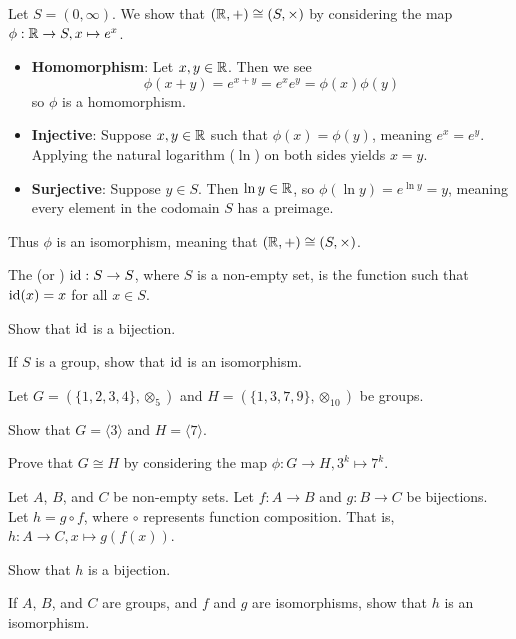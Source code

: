 \begin{example}
    Let $S = (0,\infty)$. We show that $(\mathbb{R}, +) \cong (S, \times)$ by considering the map $\phi: \mathbb{R} \to S, x \mapsto e^x$.
    \begin{itemize}
        \item \textbf{Homomorphism}: Let $x, y \in \mathbb{R}$. Then we see
        \[
            \phi(x+y) = e^{x+y} = e^xe^y = \phi(x)\phi(y)
        \]
        so $\phi$ is a homomorphism.

        \item \textbf{Injective}: Suppose $x, y \in \mathbb{R}$ such that $\phi(x) = \phi(y)$, meaning $e^x = e^y$. Applying the natural logarithm ($\ln$) on both sides yields $x = y$.

        \item \textbf{Surjective}: Suppose $y \in S$. Then $\ln y \in \mathbb{R}$, so $\phi(\ln y) = e^{\ln y} = y$, meaning every element in the codomain $S$ has a preimage.
    \end{itemize}

    Thus $\phi$ is an isomorphism, meaning that $(\mathbb{R}, +) \cong (S, \times)$.
\end{example}

\begin{exercise}\label{exercise-identity-map-is-isomorphism}
    The  (or ) $\mathrm{id}: S \to S$, where $S$ is a non-empty set, is the function such that $\mathrm{id}(x) = x$ for all $x \in S$.
    \begin{partquestions}{\roman*}
        \item Show that $\mathrm{id}$ is a bijection.
        \item If $S$ is a group, show that $\mathrm{id}$ is an isomorphism.
    \end{partquestions}
\end{exercise}
\begin{exercise}
    Let $G = (\{1, 2, 3, 4\}, \otimes_5)$ and $H = (\{1, 3, 7, 9\}, \otimes_{10})$ be groups.
    \begin{partquestions}{\roman*}
        \item Show that $G = \langle 3 \rangle$ and $H = \langle 7 \rangle$.
        \item Prove that $G \cong H$ by considering the map $\phi: G \to H, 3^k \mapsto 7^k$.
    \end{partquestions}
\end{exercise}
\begin{exercise}\label{exercise-composition-of-isomorphisms-is-isomorphisms}
    Let $A$, $B$, and $C$ be non-empty sets. Let $f: A \to B$ and $g: B \to C$ be bijections. Let $h = g\circ f$, where $\circ$ represents function composition. That is, $h: A \to C, x \mapsto g(f(x))$.
    \begin{partquestions}{\roman*}
        \item Show that $h$ is a bijection.
        \item If $A$, $B$, and $C$ are groups, and $f$ and $g$ are isomorphisms, show that $h$ is an isomorphism.
    \end{partquestions}
\end{exercise}

